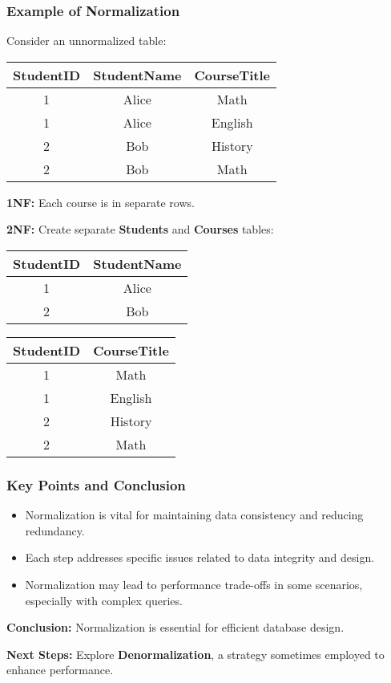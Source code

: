 \documentclass[aspectratio=169]{beamer}
\begin{document}
\begin{frame}[fragile]
    \frametitle{Example of Normalization}
    Consider an unnormalized table:

    \begin{tabular}{|c|c|c|}
        \hline
        StudentID & StudentName & CourseTitle \\
        \hline
        1 & Alice & Math \\
        1 & Alice & English \\
        2 & Bob & History \\
        2 & Bob & Math \\
        \hline
    \end{tabular}

    \textbf{1NF:} Each course is in separate rows. 

    \textbf{2NF:} Create separate \textbf{Students} and \textbf{Courses} tables:

    \begin{tabular}{|c|c|}
        \hline
        StudentID & StudentName \\
        \hline
        1 & Alice \\
        2 & Bob \\
        \hline
    \end{tabular}

    \begin{tabular}{|c|c|}
        \hline
        StudentID & CourseTitle \\
        \hline
        1 & Math \\
        1 & English \\
        2 & History \\
        2 & Math \\
        \hline
    \end{tabular}
\end{frame}

\begin{frame}[fragile]
    \frametitle{Key Points and Conclusion}
    \begin{itemize}
        \item Normalization is vital for maintaining data consistency and reducing redundancy.
        \item Each step addresses specific issues related to data integrity and design.
        \item Normalization may lead to performance trade-offs in some scenarios, especially with complex queries.
    \end{itemize}

    \textbf{Conclusion:} Normalization is essential for efficient database design. 

    \textbf{Next Steps:} Explore \textbf{Denormalization}, a strategy sometimes employed to enhance performance.
\end{frame}
\end{document}
